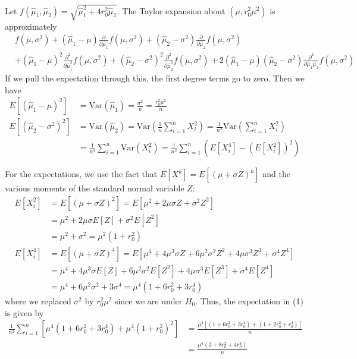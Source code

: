 \documentclass{article}
\newcommand{\var}{\mathrm{Var}}
\begin{document}
\begin{itemize}
\begin{enumerate}[(a)]
\begin{soln}
					Let $f(\hat{\mu}_1, \hat\mu_2)=\sqrt{\hat\mu_1^2+4r_0^2\hat\mu_2}.$ The Taylor expansion about $(\mu, r_0^2 \mu^2)$ is approximately
					\begin{align*}
						&f(\mu, \sigma^2) + (\hat\mu_1-\mu)\frac{\partial}{\partial\hat\mu_1}f(\mu, \sigma^2) + (\hat\mu_2-\sigma^2)\frac{\partial}{\partial\hat\mu_2}f(\mu, \sigma^2) \\
						&+ (\hat\mu_1-\mu)^2\frac{\partial^2}{\partial\hat\mu_1^2}f(\mu, \sigma^2) + (\hat\mu_2-\sigma^2)^2\frac{\partial^2}{\partial\hat\mu_2^2}f(\mu, \sigma^2) + 2(\hat\mu_1-\mu)(\hat\mu_2-\sigma^2)\frac{\partial^2}{\partial\hat\mu_1\hat\mu_2}f(\mu, \sigma^2)
					\end{align*}
					If we pull the expectation through this, the first degree terms go to zero. Then we have 
					\begin{align*}
						E\left[ (\hat{\mu}_1-\mu)^2 \right] &= \var(\hat\mu_1) = \frac{\sigma^2}{n} = \frac{r_0^2\mu^2}{n} \\
						\tag{1} E\left[ (\hat\mu_2-\sigma^2)^2 \right] &= \var(\hat\mu_2) = \var\left(\frac{1}{n} \sum_{i=1}^{n} X_i^2 \right) = \frac{1}{n^2} \var\left( \sum_{i=1}^{n} X_i^2 \right) \\
						&= \frac{1}{n^2} \sum_{i=1}^{n} \var(X_i^2) = \frac{1}{n^2} \sum_{i=1}^{n} \left( E[X_i^4] - (E[X_i^2])^2 \right)
					\end{align*}

					For the expectations, we use the fact that $E[X^k]=E[(\mu+\sigma Z)^k]$ and the various moments of the standard normal variable $Z:$
					\begin{align*}
						E[X_i^2] &= E[(\mu+\sigma Z)^2] = E\left[ \mu^2+2\mu\sigma Z + \sigma^2 Z^2 \right] \\
						&= \mu^2 + 2\mu\sigma E[Z] + \sigma^2E[Z^2] \\
						&= \mu^2 + \sigma^2  = \mu^2(1+r_0^2)\\
						E[X_i^4] &= E[(\mu+\sigma Z)^4] = E\left[\mu^4+4\mu^3\sigma Z + 6\mu^2\sigma^2 Z^2 + 4\mu\sigma^3 Z^3 + \sigma^4 Z^4 \right] \\
						&= \mu^4 + 4\mu^3\sigma E[Z] + 6\mu^2\sigma^2 E[Z^2] + 4\mu\sigma^3E[Z^3] + \sigma^4E[Z^4] \\
						&= \mu^4 + 6\mu^2\sigma^2 + 3\sigma^4 = \mu^4(1+6r_0^2+3r_0^4)
					\end{align*}
					where we replaced $\sigma^2$ by $r_0^2 \mu^2$ since we are under $H_0.$ Thus, the expectation in (1) is given by 
					\begin{align*}
						\frac{1}{n^2}\sum_{i=1}^{n} \left[ \mu^4(1+6r_0^2+3r_0^4) + \mu^4 (1+r_0^2)^2 \right] &= \frac{\mu^4\left[ (1+6r_0^2+3r_0^4) + (1+2r_0^2 + r_0^4) \right]}{n} \\
						&= \frac{\mu^4(2+8r_0^2+4r_0^4)}{n}
					\end{align*}


\end{soln}
\end{enumerate}
\end{itemize}
\end{document}

